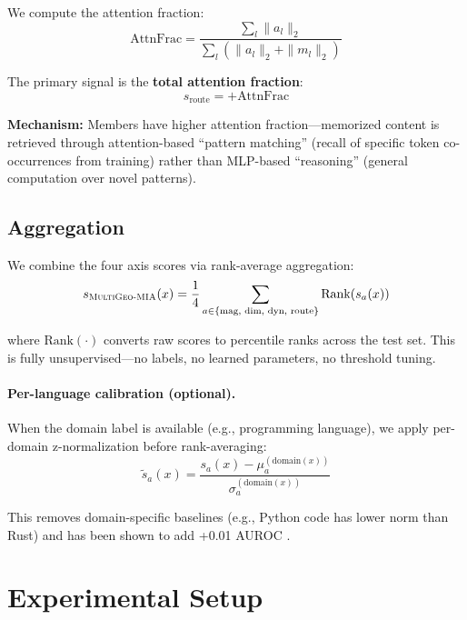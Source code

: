 \documentclass[11pt]{article}
\newcommand{\ours}{\textsc{MultiGeo-MIA}}
\begin{document}
We compute the attention fraction:
\begin{equation}
    \text{AttnFrac} = \frac{\sum_l \|a_l\|_2}{\sum_l (\|a_l\|_2 + \|m_l\|_2)}
\end{equation}

The primary signal is the \textbf{total attention fraction}:
\begin{equation}
    s_{\text{route}} = +\text{AttnFrac}
\end{equation}

\textbf{Mechanism:} Members have higher attention fraction---memorized content is retrieved through attention-based ``pattern matching'' (recall of specific token co-occurrences from training) rather than MLP-based ``reasoning'' (general computation over novel patterns).

\subsection{Aggregation}
\label{sec:aggregation}

We combine the four axis scores via rank-average aggregation:
\begin{equation}
    s_{\ours{}}(x) = \frac{1}{4} \sum_{a \in \{\text{mag, dim, dyn, route}\}} \text{Rank}(s_a(x))
\end{equation}

where $\text{Rank}(\cdot)$ converts raw scores to percentile ranks across the test set.
This is fully unsupervised---no labels, no learned parameters, no threshold tuning.

\paragraph{Per-language calibration (optional).}
When the domain label is available (e.g., programming language), we apply per-domain z-normalization before rank-averaging:
\begin{equation}
    \tilde{s}_a(x) = \frac{s_a(x) - \mu_a^{(\text{domain}(x))}}{\sigma_a^{(\text{domain}(x))}}
\end{equation}

This removes domain-specific baselines (e.g., Python code has lower norm than Rust) and has been shown to add +0.01 AUROC \citep{poisonedchalice2026}.

\section{Experimental Setup}
\label{sec:setup}
\end{document}
